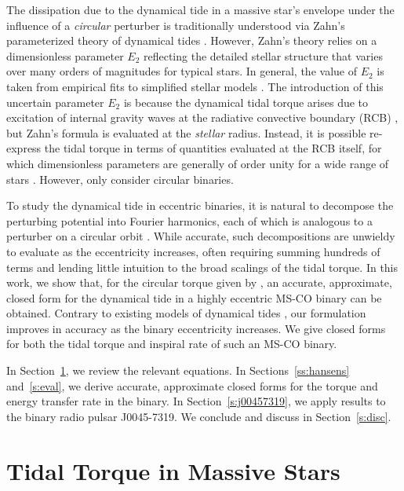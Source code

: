 \documentclass[
        fleqn,
        usenatbib,
    ]{mnras}
\begin{document}
The dissipation due to the dynamical tide in a massive star's envelope under the
influence of a \emph{circular} perturber is traditionally understood via Zahn's
parameterized theory of dynamical tides \citep{zahn1975dynamical}. However,
Zahn's theory relies on a dimensionless parameter $E_2$ reflecting the detailed
stellar structure that varies over many orders of magnitudes for typical stars.
In general, the value of $E_2$ is taken from empirical fits to simplified
stellar models \citep{hurley2002evolution, vigna2020common}. The introduction of
this uncertain parameter $E_2$ is because the dynamical tidal torque arises due
to excitation of internal gravity waves at the radiative convective boundary
(RCB) \citep{goldreich1989tidal, savonije1983tidal}, but Zahn's formula is
evaluated at the \emph{stellar} radius. Instead, it is possible re-express the
tidal torque in terms of quantities evaluated at the RCB itself, for which
dimensionless parameters are generally of order unity for a wide range of stars
\citep{kushnir}. However, \citet{kushnir} only consider circular binaries.

To study the dynamical tide in eccentric binaries, it is natural to decompose
the perturbing potential into Fourier harmonics, each of which is analogous to a
perturber on a circular orbit \citep[e.g.][]{sl, vlf}. While accurate, such
decompositions are unwieldy to evaluate as the eccentricity increases, often
requiring summing hundreds of terms and lending little intuition to the broad
scalings of the tidal torque. In this work, we show that, for the circular
torque given by \citet{kushnir}, an accurate, approximate, closed form for the
dynamical tide in a highly eccentric MS-CO binary can be obtained. Contrary to
existing models of dynamical tides \citep[e.g.][]{vigna2020common}, our
formulation improves in accuracy as the binary eccentricity increases.  We give
closed forms for both the tidal torque and inspiral rate of such an MS-CO
binary.

In Section~\ref{s:background}, we review the relevant equations. In
Sections~\ref{ss:hansens} and~\ref{s:eval}, we derive accurate, approximate
closed forms for the torque and energy transfer rate in the binary. In
Section~\ref{s:j00457319}, we apply results to the binary radio pulsar
J0045-7319. We conclude and discuss in Section~\ref{s:disc}.

\section{Tidal Torque in Massive Stars}\label{s:background}
\end{document}
